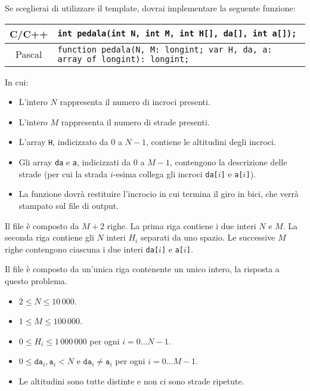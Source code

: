 Se sceglierai di utilizzare il template, dovrai implementare la seguente funzione:
\begin{center}\begin{tabularx}{\textwidth}{|c|X|}
\hline
C/C++  & \verb|int pedala(int N, int M, int H[], da[], int a[]);|\\
\hline
Pascal & \verb|function pedala(N, M: longint; var H, da, a: array of longint): longint;|\\
\hline
\end{tabularx}\end{center}
In cui:
\begin{itemize}[nolistsep]
  \item L'intero $N$ rappresenta il numero di incroci presenti.
  \item L'intero $M$ rappresenta il numero di strade presenti.
  \item L'array \texttt{H}, indicizzato da $0$ a $N-1$, contiene le altitudini degli incroci.
  \item Gli array \texttt{da} e \texttt{a}, indicizzati da $0$ a $M-1$, contengono la descrizione delle strade (per cui la strada $i$-esima collega gli incroci \texttt{da[$i$]} e \texttt{a[$i$]}).
  \item La funzione dovrà restituire l'incrocio in cui termina il giro in bici, che verrà stampato sul file di output.
\end{itemize}

\InputFile
Il file  è composto da $M+2$ righe. La prima riga contiene i due interi $N$ e $M$. La seconda riga contiene gli $N$ interi $H_i$ separati da uno spazio. Le successive $M$ righe contengono ciascuna i due interi \texttt{da[$i$]} e \texttt{a[$i$]}.

\OutputFile
Il file \outputfile{} è composto da un'unica riga contenente un unico intero, la risposta a questo problema.

\pagebreak
\Constraints
\begin{itemize}[nolistsep, itemsep=2mm]
	\item $2 \le N \le 10\,000$.
	\item $1 \le M \le 100\,000$.
	\item $0 \le H_i \le 1\,000\,000$ per ogni $i=0\ldots N-1$.
	\item $0 \le \texttt{da}_i, \texttt{a}_i < N$ e $\texttt{da}_i \neq \texttt{a}_i$ per ogni $i=0\ldots M-1$.
	\item Le altitudini sono tutte distinte e non ci sono strade ripetute.
\end{itemize}

